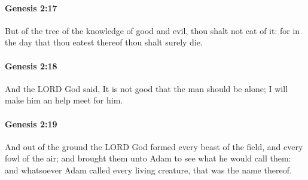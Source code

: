 		\paragraph{Genesis 2:17} %
			\label{GENESIS-2-17}

			But of the tree of the knowledge of good and evil, thou shalt not eat of it: for in the day that thou eatest thereof thou shalt surely die.


		\paragraph{Genesis 2:18} %
			\label{GENESIS-2-18}

			And the LORD God said, It is not good that the man should be alone; I will make him an help meet for him.


		\paragraph{Genesis 2:19} %
			\label{GENESIS-2-19}

			And out of the ground the LORD God formed every beast of the field, and every fowl of the air; and brought them unto Adam to see what he would call them: and whatsoever Adam called every living creature, that was the name thereof.


